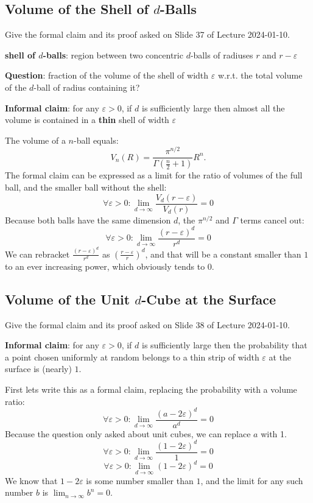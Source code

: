 \documentclass{article}
\let\epsilon\varepsilon
\begin{document}
  \subsection{Volume of the Shell of $d$-Balls}
  \begin{centerframebox}
    Give the formal claim and its proof asked on Slide 37 of Lecture 2024-01-10.

    \textbf{shell of $d$-balls}: region between two concentric $d$-balls of radiuses $r$ and $r-\epsilon$

    \textbf{Question}: fraction of the volume of the shell of width $\epsilon$ w.r.t. the total volume of the $d$-ball of radius containing it?

    \textbf{Informal claim}: for any $\epsilon > 0$, if $d$ is sufficiently large then almost all the volume is contained in a \textbf{thin} shell of width $\epsilon$
  \end{centerframebox}
  The volume of a $n$-ball equals:
  \[ V_n(R) = \frac{\pi^{n/2}}{\Gamma\left(\tfrac n2 + 1\right)}R^n. \]
  The formal claim can be expressed as a limit for the ratio of volumes of the full ball, and the smaller ball without the shell:
  \[ \forall \epsilon > 0 : \lim_{d \to \infty} \frac{V_d(r - \epsilon)}{V_d(r)} = 0 \]
  Because both balls have the same dimension $d$, the $\pi^{n/2}$ and $\Gamma$ terms cancel out:
  \[ \forall \epsilon > 0 : \lim_{d \to \infty} \frac{(r - \epsilon)^d}{r^d} = 0 \]
  We can rebracket $\frac{(r - \epsilon)^d}{r^d}$ as $\left(\frac{r - \epsilon}{r}\right)^d$,
  and that will be a constant smaller than $1$ to an ever increasing power, which obviously tends to $0$.

  \subsection{Volume of the Unit $d$-Cube at the Surface}
  \begin{centerframebox}
    Give the formal claim and its proof asked on Slide 38 of Lecture 2024-01-10.

    \textbf{Informal claim}: for any $\epsilon > 0$, if $d$ is sufficiently large then the probability that a point chosen uniformly at random belongs to a thin strip of width $\epsilon$ at the surface is (nearly) $1$.
  \end{centerframebox}
  First lets write this as a formal claim, replacing the probability with a volume ratio:
  \[ \forall \epsilon > 0 : \lim_{d \to \infty} \frac{(a - 2\epsilon)^d}{a^d} = 0 \]
  Because the question only asked about unit cubes, we can replace $a$ with 1.
  \[ \forall \epsilon > 0 : \lim_{d \to \infty} \frac{(1 - 2\epsilon)^d}{1} = 0 \]
  \[ \forall \epsilon > 0 : \lim_{d \to \infty} (1 - 2\epsilon)^d = 0 \]
  We know that $1 - 2\epsilon$ is some number smaller than $1$, and the limit for any such number $b$ is $\lim_{n \to \infty} b^n = 0$.
\end{document}
